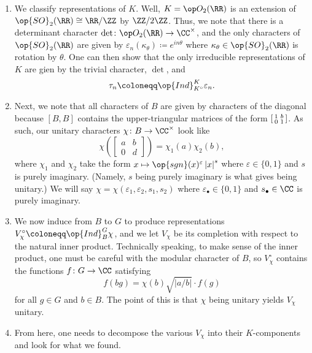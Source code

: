 \documentclass{article}
\begin{document}
\begin{enumerate}
	\item We classify representations of $K$. Well, $K=\op O_2(\RR)$ is an extension of $\op{SO}_2(\RR)\cong\RR/\ZZ$ by $\ZZ/2\ZZ$. Thus, we note that there is a determinant character $\det\colon\op O_2(\RR)\to\CC^\times$, and the only characters of $\op{SO}_2(\RR)$ are given by $\varepsilon_n(\kappa_\theta)\coloneqq e^{in\theta}$ where $\kappa_\theta\in\op{SO}_2(\RR)$ is rotation by $\theta$. One can then show that the only irreducible representations of $K$ are gien by the trivial character, $\det$, and
	\[\tau_n\coloneqq\op{Ind}_{K^\circ}^K\varepsilon_n.\]
	\item Next, we note that all characters of $B$ are given by characters of the diagonal because $[B,B]$ contains the upper-triangular matrices of the form $\begin{bsmallmatrix}
		1 & b \\ 0 & 1
	\end{bsmallmatrix}$. As such, our unitary characters $\chi\colon B\to\CC^\times$ look like
	\[\chi\left(\begin{bmatrix}
		a & b \\ 0 & d
	\end{bmatrix}\right)=\chi_1(a)\chi_2(b),\]
	where $\chi_1$ and $\chi_2$ take the form $x\mapsto\op{sgn}(x)^\varepsilon\left|x\right|^s$ where $\varepsilon\in\{0,1\}$ and $s$ is purely imaginary. (Namely, $s$ being purely imaginary is what gives being unitary.) We will say $\chi=\chi(\varepsilon_1,\varepsilon_2,s_1,s_2)$ where $\varepsilon_\bullet\in\{0,1\}$ and $s_\bullet\in\CC$ is purely imaginary.
	\item We now induce from $B$ to $G$ to produce representations $V_\chi^\circ\coloneqq\op{Ind}_B^G\chi$, and we let $V_\chi$ be its completion with respect to the natural inner product. Technically speaking, to make sense of the inner product, one must be careful with the modular character of $B$, so $V_\chi^\circ$ contains the functions $f\colon G\to\CC$ satisfying
	\[f(bg)=\chi(b)\sqrt{\left|a/b\right|}\cdot f(g)\]
	for all $g\in G$ and $b\in B$. The point of this is that $\chi$ being unitary yields $V_\chi$ unitary.
	\item From here, one needs to decompose the various $V_\chi$ into their $K$-components and look for what we found.
\end{enumerate}
\end{document}

